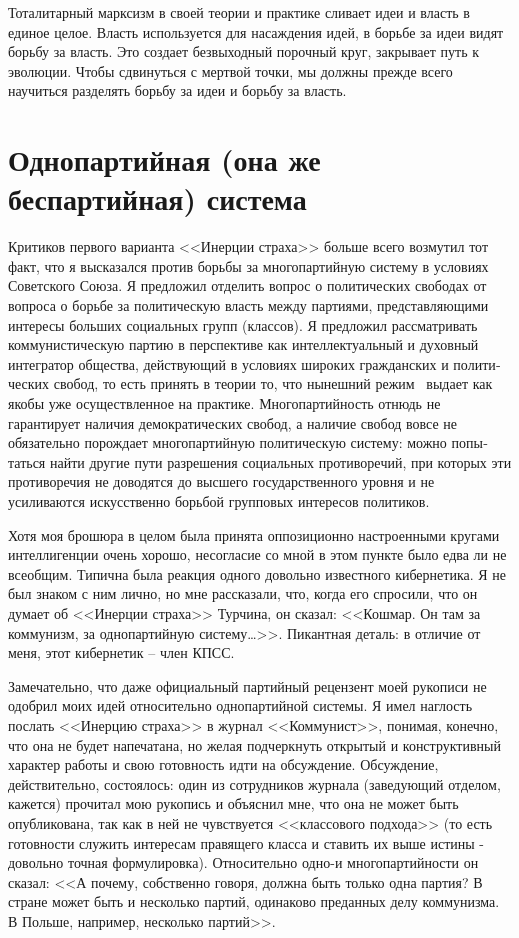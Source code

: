 \documentclass{book}
\begin{document}
Тоталитарный марксизм в своей теории и практике сливает идеи и власть в единое целое. Власть используется для насаж­дения идей, в борьбе за идеи видят борьбу за власть. Это со­здает безвыходный порочный круг, закрывает путь к эволю­ции. Чтобы сдвинуться с мертвой точки, мы должны прежде всего научиться разделять борьбу за идеи и борьбу за власть.


\section{Однопартийная (она же беспартийная) система}

Критиков первого варианта <<Инерции страха>> больше всего возмутил тот факт, что я высказался против борьбы за много­партийную систему в условиях Советского Союза. Я предло­жил отделить вопрос о политических свободах от вопроса о борьбе за политическую власть между партиями, представля­ющими интересы больших социальных групп (классов). Я предложил рассматривать коммунистическую партию в пер­спективе как интеллектуальный и духовный интегратор общества, действующий в условиях широких гражданских и полити­ческих свобод, то есть принять в теории то, что нынешний ре­жим  выдает как якобы уже осуществленное на практике. Многопартийность отнюдь не гарантирует наличия демократи­ческих свобод, а наличие свобод вовсе не обязательно порож­дает многопартийную политическую систему: можно попы­таться найти другие пути разрешения социальных противоре­чий, при которых эти противоречия не доводятся до высшего государственного уровня и не усиливаются искусственно борь­бой групповых интересов политиков.

Хотя моя брошюра в целом была принята оппозиционно настроенными кругами интеллигенции очень хорошо, несо­гласие со мной в этом пункте было едва ли не всеобщим. Ти­пична была реакция одного довольно известного кибернетика. Я не был знаком с ним лично, но мне рассказали, что, когда его спросили, что он думает об <<Инерции страха>> Турчина, он сказал: <<Кошмар. Он там за коммунизм, за однопартийную систему\ldots>>. Пикантная деталь: в отличие от меня, этот кибер­нетик -- член КПСС.

Замечательно, что даже официальный партийный рецензент моей рукописи не одобрил моих идей относительно однопар­тийной системы. Я имел наглость послать <<Инерцию страха>> в журнал <<Коммунист>>, понимая, конечно, что она не будет напечатана, но желая подчеркнуть открытый и конструктив­ный характер работы и свою готовность идти на обсуждение. Обсуждение, действительно, состоялось: один из сотрудников журнала (заведующий отделом, кажется) прочитал мою ру­копись и объяснил мне, что она не может быть опубликована, так как в ней не чувствуется <<классового подхода>> (то есть готовности служить интересам правящего класса и ставить их выше истины - довольно точная формулировка). Относитель­но одно-и многопартийности он сказал: <<А почему, собствен­но говоря, должна быть только одна партия? В стране может быть и несколько партий, одинаково преданных делу комму­низма. В Польше, например, несколько партий>>.
\end{document}
